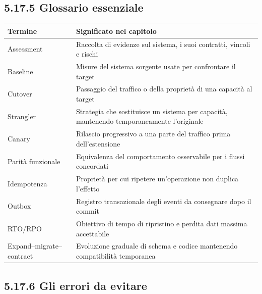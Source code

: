 \documentclass[
  italian,
  10pt,
]{book}
\newcounter{none} %
\begin{document}
\subsection{5.17.5 Glossario essenziale}\label{glossario-essenziale}

{\def\LTcaptype{none} %
\begin{longtable}[]{@{}
  >{\raggedright\arraybackslash}p{}
  >{\raggedright\arraybackslash}p{}@{}}
\toprule\noalign{}
\begin{minipage}[b]{\linewidth}\raggedright
Termine
\end{minipage} & \begin{minipage}[b]{\linewidth}\raggedright
Significato nel capitolo
\end{minipage} \\
\midrule\noalign{}
\endhead
\bottomrule\noalign{}
\endlastfoot
Assessment & Raccolta di evidenze sul sistema, i suoi contratti, vincoli
e rischi \\
Baseline & Misure del sistema sorgente usate per confrontare il
target \\
Cutover & Passaggio del traffico o della proprietà di una capacità al
target \\
Strangler & Strategia che sostituisce un sistema per capacità,
mantenendo temporaneamente l'originale \\
Canary & Rilascio progressivo a una parte del traffico prima
dell'estensione \\
Parità funzionale & Equivalenza del comportamento osservabile per i
flussi concordati \\
Idempotenza & Proprietà per cui ripetere un'operazione non duplica
l'effetto \\
Outbox & Registro transazionale degli eventi da consegnare dopo il
commit \\
RTO/RPO & Obiettivo di tempo di ripristino e perdita dati massima
accettabile \\
Expand--migrate--contract & Evoluzione graduale di schema e codice
mantenendo compatibilità temporanea \\
\end{longtable}
}

\subsection{5.17.6 Gli errori da evitare}\label{gli-errori-da-evitare}
\end{document}
